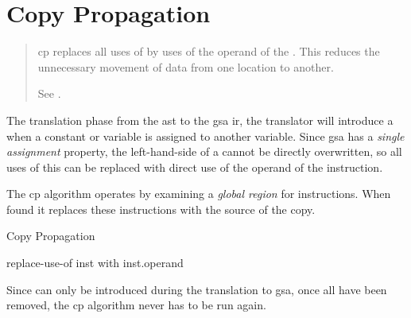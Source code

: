 \chapter{Copy Propagation}

\begin{quote}
  \ac{cp} replaces all uses of  by uses of the operand
  of the .  This reduces the unnecessary movement of
  data from one location to another.

  See .
\end{quote}

The translation phase from the \ac{ast} to the \ac{gsa} \ac{ir}, the
translator will introduce a  when a constant or variable
is assigned to another variable.  Since \ac{gsa} has a \emph{single
  assignment} property, the left-hand-side of a  cannot
be directly overwritten, so all uses of this  can be
replaced with direct use of the operand of the instruction.

The \ac{cp} algorithm operates by examining a \emph{global region} for
 instructions.  When found it replaces these
instructions with the source of the copy.

\begin{algorithm}[h!]
  \caption{Copy Propagation}
  \begin{algorithmic}[1]

    \STATE
    \STATE replace-use-of inst with inst.operand
    \ENDIF
    \ENDFOR
    \ENDFOR
  \end{algorithmic}
\end{algorithm}

Since  can only be introduced during the translation to
\ac{gsa}, once all have been removed, the \ac{cp} algorithm never has
to be run again.

